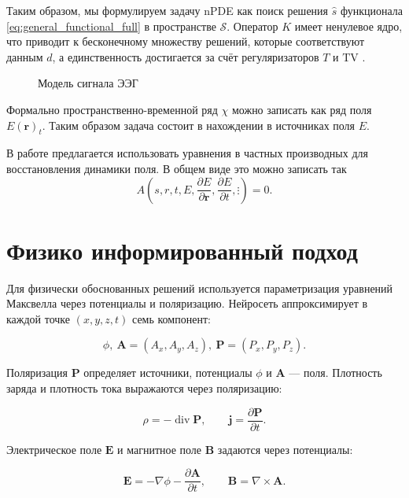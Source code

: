 \documentclass[a4paper,14pt,oneside,openany]{extarticle}
\begin{document}
Таким образом, мы формулируем задачу nPDE как поиск решения $\hat{s}$ функционала \eqref{eq:general_functional_full} в 
пространстве $\mathcal{S}$. Оператор $K$ имеет ненулевое ядро, что приводит к бесконечному множеству решений, 
которые соответствуют данным $d$, а единственность достигается за счёт регуляризаторов $T$ и $\mathrm{TV}$ \cite{Morik2024}.

\begin{figure}[H]
\centerline{
}
\caption{Модель сигнала ЭЭГ}
\label{fig: LNN}
\end{figure}

Формально пространственно-временной ряд $\chi$ можно записать как ряд поля $E(\mathbf{r})_t$. Таким образом задача состоит в нахождении в источниках поля $E$. 

В работе предлагается использовать уравнения в частных производных для восстановления динамики поля. В общем виде это можно записать так
$$A\left(s, r, t, E, \frac{\partial E}{\partial{\mathbf{r}}}, \frac{\partial E}{\partial{t}}, \vdots \right)= 0.$$

\newpage
\section{Физико информированный подход}
Для физически обоснованных решений используется параметризация уравнений Максвелла через потенциалы и поляризацию. Нейросеть аппроксимирует в каждой точке $(x,y,z,t)$ семь компонент:

\[\phi,\ \mathbf{A}=(A_x,A_y,A_z),\ \mathbf{P}=(P_x,P_y,P_z).\]

Поляризация $\mathbf{P}$ определяет источники, потенциалы $\phi$ и $\mathbf{A}$ --- поля. Плотность заряда и плотность тока выражаются через поляризацию:

\begin{equation}
    \rho = -\operatorname{div} \mathbf{P},
    \qquad
    \mathbf{j} = \frac{\partial \mathbf{P}}{\partial t}.
\end{equation}

Электрическое поле $\mathbf{E}$ и магнитное поле $\mathbf{B}$ задаются через потенциалы:

\begin{equation}
    \mathbf{E} = -\nabla \phi - \frac{\partial \mathbf{A}}{\partial t},
    \qquad
    \mathbf{B} = \nabla \times \mathbf{A}.
\end{equation}
\end{document}
